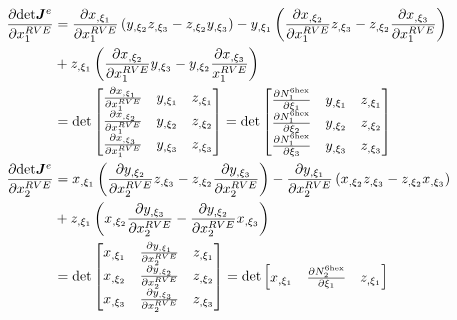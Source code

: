 \begin{align}
\frac{\partial \text{det}\mat{J}^e}{\partial x_1^{RVE}} &= \frac{\partial x_{,\xi_1}}{\partial x_1^{RVE}}\left(y_{,\xi_2}z_{,\xi_3} - z_{,\xi_2}y_{,\xi_3} \right) - y_{,\xi_1}\left(\frac{\partial x_{,\xi_2}}{\partial x_1^{RVE}}z_{,\xi_3}-z_{,\xi_2}\frac{\partial x_{,\xi_3}}{\partial x_1^{RVE}} \right) \nonumber \\ 
&+ z_{,\xi_1}\left(\frac{\partial x_{,\xi_2}}{\partial x_1^{RVE}}y_{,\xi_3}-y_{,\xi_2}\frac{\partial x_{,\xi_3}}{x_1^{RVE}} \right) \nonumber\\
%
&= \text{det} \begin{bmatrix}
\frac{\partial x_{,\xi_1}}{\partial x_1^{RVE}} & y_{,\xi_1} & z_{,\xi_1} \\
\frac{\partial x_{,\xi_2}}{\partial x_1^{RVE}} & y_{,\xi_2} & z_{,\xi_2} \\
\frac{\partial x_{,\xi_3}}{\partial x_1^{RVE}} & y_{,\xi_3} & z_{,\xi_3}
\end{bmatrix} 
%
= \text{det} \begin{bmatrix}
\frac{\partial N_1^{6\text{hex}}}{\partial \xi_1} & y_{,\xi_1} & z_{,\xi_1} \\
\frac{\partial N_1^{6\text{hex}}}{\partial \xi_2} & y_{,\xi_2} & z_{,\xi_2} \\
\frac{\partial N_1^{6\text{hex}}}{\partial \xi_3} & y_{,\xi_3} & z_{,\xi_3}
\end{bmatrix} \nonumber\\
\frac{\partial \text{det}\mat{J}^e}{\partial x_2^{RVE}} &= x_{,\xi_1}\left(\frac{\partial y_{,\xi_2}}{\partial x_2^{RVE}}z_{,\xi_3} - z_{,\xi_2}\frac{\partial y_{,\xi_3}}{\partial x_2^{RVE}} \right) - \frac{\partial y_{,\xi_1}}{\partial x_2^{RVE}}\left(x_{,\xi_2}z_{,\xi_3}-z_{,\xi_2}x_{,\xi_3} \right) \nonumber \\
&+ z_{,\xi_1}\left(x_{,\xi_2}\frac{\partial y_{,\xi_3}}{\partial x_2^{RVE}}-\frac{\partial y_{,\xi_2}}{\partial x_2^{RVE}}x_{,\xi_3} \right) \nonumber\\
&= \text{det} \begin{bmatrix}
x_{,\xi_1} & \frac{\partial y_{,\xi_1}}{\partial x_2^{RVE}} & z_{,\xi_1} \\
x_{,\xi_2} & \frac{\partial y_{,\xi_2}}{\partial x_2^{RVE}} & z_{,\xi_2} \\
x_{,\xi_3} & \frac{\partial y_{,\xi_3}}{\partial x_2^{RVE}} & z_{,\xi_3}
\end{bmatrix} 
= \text{det} \begin{bmatrix}
x_{,\xi_1} & \frac{\partial N_2^{6\text{hex}}}{\partial \xi_1} & z_{,\xi_1} \\

\end{bmatrix}
\end{align}
